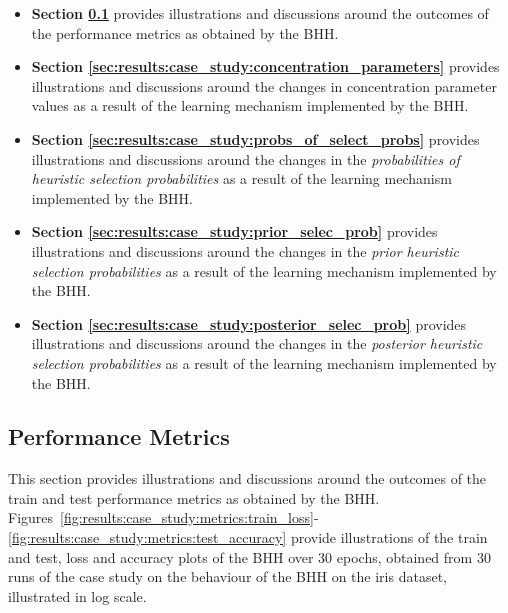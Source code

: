 \begin{itemize}
      \item \textbf{Section \ref{sec:results:case_study:performance_metrics}} provides illustrations and discussions around the outcomes of the performance metrics as obtained by the \acs{BHH}.

      \item \textbf{Section \ref{sec:results:case_study:concentration_parameters}} provides illustrations and discussions around the changes in concentration parameter values as a result of the learning mechanism implemented by the \acs{BHH}.

      \item \textbf{Section \ref{sec:results:case_study:probs_of_select_probs}} provides illustrations and discussions around the changes in the \textit{probabilities of heuristic selection probabilities} as a result of the learning mechanism implemented by the \acs{BHH}.

      \item \textbf{Section \ref{sec:results:case_study:prior_selec_prob}} provides illustrations and discussions around the changes in the \textit{prior heuristic selection probabilities} as a result of the learning mechanism implemented by the \acs{BHH}.

      \item \textbf{Section \ref{sec:results:case_study:posterior_selec_prob}} provides illustrations and discussions around the changes in the \textit{posterior heuristic selection probabilities} as a result of the learning mechanism implemented by the \acs{BHH}.


\end{itemize}

\subsection{Performance Metrics}\label{sec:results:case_study:performance_metrics}

This section provides illustrations and discussions around the outcomes of the train and test performance metrics as obtained by the \acs{BHH}. Figures~\ref{fig:results:case_study:metrics:train_loss}-\ref{fig:results:case_study:metrics:test_accuracy} provide illustrations of the train and test, loss and accuracy plots of the \acs{BHH} over 30 epochs, obtained from 30 runs of the case study on the behaviour of the \acs{BHH} on the iris dataset, illustrated in log scale.

